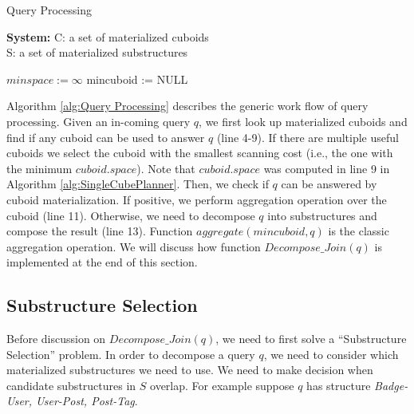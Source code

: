 \begin{algorithm}[H]
\label{alg:Query Processing}
\caption{Query Processing}
\LinesNumbered
\textbf{System:} C: a set of materialized cuboids\\ S: a set of materialized substructures\\ 

$minspace:= \infty $\;
mincuboid := NULL\;
\end{algorithm}

Algorithm \ref{alg:Query Processing} describes the generic work flow of query processing. Given an in-coming query $q$, 
we first look up materialized cuboids and find if any cuboid can be used to answer $q$ (line 4-9). If there are multiple useful cuboids we select the cuboid with the smallest scanning cost (i.e., the one with the minimum $cuboid.space$). Note that $cuboid.space$ was computed in line 9 in Algorithm \ref{alg:SingleCubePlanner}. Then, we check if $q$ can be answered by cuboid materialization. If positive, we perform aggregation operation over the cuboid (line 11). Otherwise, we need to decompose $q$ into substructures and compose the result (line 13). Function $aggregate(mincuboid, q)$ is the classic aggregation operation. We will discuss how function $Decompose\_Join(q)$ is implemented at the end of this section. 

\subsection{Substructure Selection}
\label{Substructure Selection}

Before discussion on $Decompose\_Join(q)$, we need to first solve a ``Substructure Selection'' problem. In order to decompose a query $q$, we need to consider which materialized substructures we need to use. We need to make decision when candidate substructures in $S$ overlap. For example suppose $q$ has structure \textit{Badge-User, User-Post, Post-Tag}.

